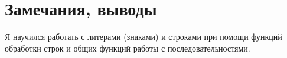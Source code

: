 \documentclass[12pt]{article}
\begin{document}
%


\section{Замечания, выводы}
Я научился работать с литерами (знаками) и строками при помощи функций обработки строк и общих функций работы с последовательностями.
\end{document}
